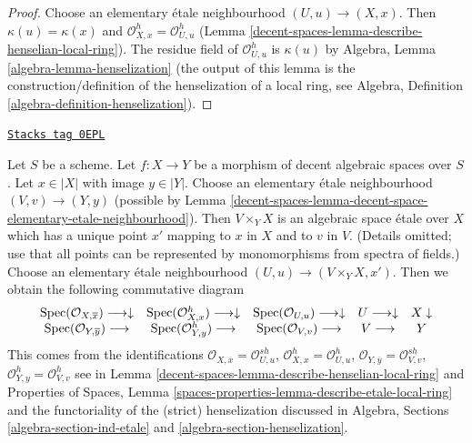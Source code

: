 \begin{proof}
Choose an elementary \'etale neighbourhood $(U, u) \to (X, x)$.
Then $\kappa(u) = \kappa(x)$ and
$\mathcal{O}_{X, x}^h = \mathcal{O}_{U, u}^h$
(Lemma \ref{decent-spaces-lemma-describe-henselian-local-ring}).
The residue field of $\mathcal{O}_{U, u}^h$
is $\kappa(u)$ by Algebra, Lemma \ref{algebra-lemma-henselization}
(the output of this lemma is the construction/definition
of the henselization of a local ring, see
Algebra, Definition \ref{algebra-definition-henselization}).
\end{proof}

\begin{remark}
\label{decent-spaces-remark-functoriality-henselian-local-ring}
\href{https://stacks.math.columbia.edu/tag/0EPL}{\texttt{Stacks tag 0EPL}}

Let $S$ be a scheme. Let $f : X \to Y$ be a morphism of decent algebraic spaces
over $S$. Let $x \in |X|$ with image $y \in |Y|$. Choose an elementary
\'etale neighbourhood $(V, v) \to (Y, y)$ (possible by
Lemma \ref{decent-spaces-lemma-decent-space-elementary-etale-neighbourhood}).
Then $V \times_Y X$ is an algebraic space \'etale over $X$
which has a unique point $x'$ mapping to $x$ in $X$ and to $v$ in $V$.
(Details omitted; use that all points can be represented by
monomorphisms from spectra of fields.)
Choose an elementary \'etale neighbourhood $(U, u) \to (V \times_Y X, x')$.
Then we obtain the following commutative diagram
$$
\begin{array}{ccccc}\operatorname{Spec}(\mathcal{O}_{X, \overline{x}}) \longrightarrow\downarrow & \operatorname{Spec}(\mathcal{O}_{X, x}^h) \longrightarrow\downarrow & \operatorname{Spec}(\mathcal{O}_{U, u}) \longrightarrow\downarrow & U \longrightarrow\downarrow & X \downarrow \\ \operatorname{Spec}(\mathcal{O}_{Y, \overline{y}}) \longrightarrow & \operatorname{Spec}(\mathcal{O}_{Y, y}^h) \longrightarrow & \operatorname{Spec}(\mathcal{O}_{V, v}) \longrightarrow & V \longrightarrow & Y\end{array}
$$
This comes from the identifications
$\mathcal{O}_{X, \overline{x}} = \mathcal{O}_{U, u}^{sh}$,
$\mathcal{O}_{X, x}^h = \mathcal{O}_{U, u}^h$,
$\mathcal{O}_{Y, \overline{y}} = \mathcal{O}_{V, v}^{sh}$,
$\mathcal{O}_{Y, y}^h = \mathcal{O}_{V, v}^h$
see in
Lemma \ref{decent-spaces-lemma-describe-henselian-local-ring}
and
Properties of Spaces, Lemma
\ref{spaces-properties-lemma-describe-etale-local-ring}
and the functoriality of the (strict) henselization
discussed in Algebra, Sections \ref{algebra-section-ind-etale} and
\ref{algebra-section-henselization}.
\end{remark}

